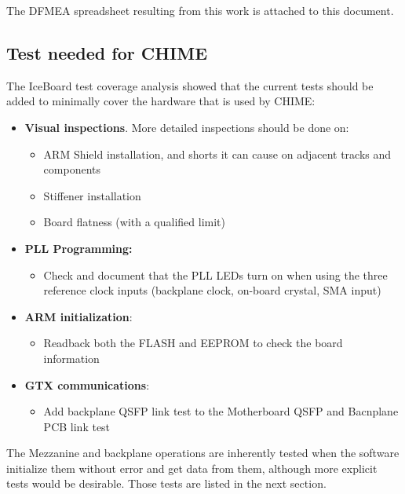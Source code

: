 \documentclass[11pt,article]{memoir}
\begin{document}
The DFMEA spreadsheet resulting from this work is attached to this document.

\subsection{Test needed for CHIME}

The IceBoard test coverage analysis showed that the current tests should be added to minimally cover the hardware that is used by CHIME:

\begin{itemize}
\item \textbf{Visual inspections}. More detailed inspections should be done on:
	\begin{itemize}
	\item ARM Shield installation, and shorts it can cause on adjacent tracks and components
	\item Stiffener installation
	\item Board flatness (with a qualified limit)
	\end{itemize}

\item \textbf{PLL Programming:}
	\begin{itemize}
	\item Check and document that the PLL LEDs turn on when using the three reference clock inputs (backplane clock, on-board crystal, SMA input)
	\end{itemize}

\item \textbf{ARM initialization}:
	\begin{itemize}
	\item Readback both the FLASH and EEPROM to check the board information
	\end{itemize}

\item \textbf{GTX communications}:
	\begin{itemize}
	\item Add backplane QSFP link test to the Motherboard QSFP and Bacnplane PCB link test
	\end{itemize}

\end{itemize}

The Mezzanine and backplane operations are inherently tested when the software initialize them without error and get data from them, although more explicit tests would be desirable. Those tests are listed in the next section.
\end{document}
